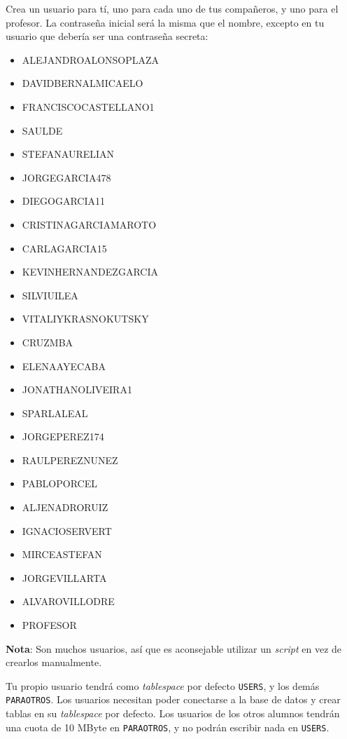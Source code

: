\begin{homeworkProblem}

  Crea un usuario para tí, uno para cada uno de tus compañeros, y uno para el profesor. La contraseña inicial será la misma que el nombre, excepto en tu usuario que debería ser una contraseña secreta:
  \begin{multicols}{3}
    \begin{itemize}
    \item ALEJANDROALONSOPLAZA
    \item DAVIDBERNALMICAELO  
    \item FRANCISCOCASTELLANO1
    \item SAULDE              
    \item STEFANAURELIAN      
    \item JORGEGARCIA478      
    \item DIEGOGARCIA11       
    \item CRISTINAGARCIAMAROTO
    \item CARLAGARCIA15       
    \item KEVINHERNANDEZGARCIA
    \item SILVIUILEA          
    \item VITALIYKRASNOKUTSKY 
    \item CRUZMBA             
    \item ELENAAYECABA        
    \item JONATHANOLIVEIRA1   
    \item SPARLALEAL          
    \item JORGEPEREZ174       
    \item RAULPEREZNUNEZ      
    \item PABLOPORCEL         
    \item ALJENADRORUIZ       
    \item IGNACIOSERVERT      
    \item MIRCEASTEFAN        
    \item JORGEVILLARTA       
    \item ALVAROVILLODRE      
    \item PROFESOR
    \end{itemize}
  \end{multicols}
  {\small \textbf{Nota}: Son muchos usuarios, así que es aconsejable utilizar un \textit{script} en vez de crearlos manualmente.}

  Tu propio usuario tendrá como \textit{tablespace} por defecto \texttt{USERS}, y los demás \texttt{PARAOTROS}. Los usuarios necesitan poder conectarse a la base de datos y crear tablas en su \textit{tablespace} por defecto. Los usuarios de los otros alumnos tendrán una cuota de 10 MByte en \texttt{PARAOTROS}, y no podrán escribir nada en \texttt{USERS}.
  

\end{homeworkProblem}
